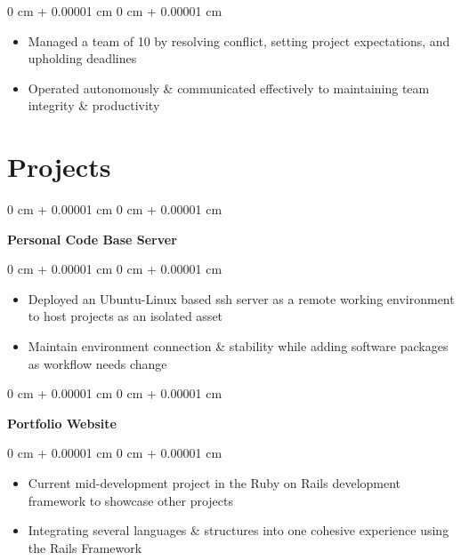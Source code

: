 \documentclass[10pt, letterpaper]{article}
\newenvironment{highlights}{
    \begin{itemize}[
        topsep=0.10 cm,
        parsep=0.10 cm,
        partopsep=0pt,
        itemsep=0pt,
        leftmargin=0 cm + 10pt
    ]
}{
    \end{itemize}
} %
\newenvironment{onecolentry}{
    \begin{adjustwidth}{
        0 cm + 0.00001 cm
    }{
        0 cm + 0.00001 cm
    }
}{
    \end{adjustwidth}
} %
\newenvironment{twocolentry}[2][]{
    \onecolentry%
    \def\secondColumn{#2}
    \setcolumnwidth{\fill, 7.0 cm}
    \begin{paracol}{2}
}{
    \switchcolumn\raggedleft\secondColumn%
    \end{paracol}
    \endonecolentry%
} %
\begin{document}
        \vspace{0.10 cm}
        \begin{onecolentry}
            \begin{highlights}
                \item Managed a team of 10 by resolving conflict, setting project expectations, and upholding deadlines
                \item Operated autonomously \& communicated effectively to maintaining team integrity \& productivity
            \end{highlights}
        \end{onecolentry}
    
    {\color{secondaryColor}\section{Projects}}



        
        \begin{onecolentry}
            \textbf{Personal Code Base Server}
        \end{onecolentry}
            
        \vspace{0.10 cm}

        \begin{onecolentry}
            \begin{highlights}
                \item Deployed an Ubuntu-Linux based ssh server as a remote working environment to host projects as an isolated asset
                \item Maintain environment connection \& stability while adding software packages as workflow needs change
            \end{highlights}
        \end{onecolentry}



        \vspace{0.2 cm}

        \begin{twocolentry}{
            \href{https://github.com/thatchereames/website}{\color{secondaryColor}{github.com/thatchereames/website}}
        }
            \textbf{Portfolio Website}\end{twocolentry}

        \vspace{0.10 cm}
        \begin{onecolentry}
            \begin{highlights}
                \item Current mid-development project in the Ruby on Rails development framework to showcase other projects
                \item Integrating several languages \& structures into one cohesive experience using the Rails Framework
            \end{highlights}
        \end{onecolentry}
\end{document}

